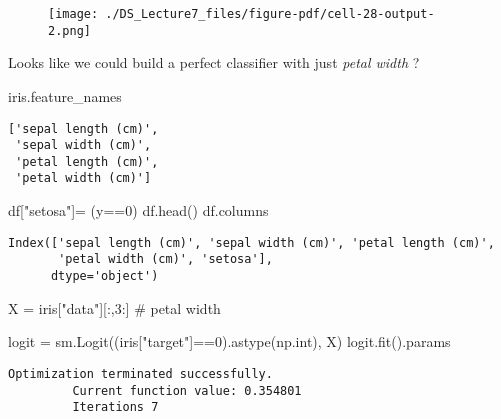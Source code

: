 \documentclass[
  letterpaper,
  DIV=11,
  numbers=noendperiod]{scrreprt}
\newenvironment{Shaded}{\begin{snugshade}}{\end{snugshade}}
\newcommand{\BuiltInTok}[1]{\textcolor[rgb]{0.00,0.23,0.31}{#1}}
\newcommand{\CommentTok}[1]{\textcolor[rgb]{0.37,0.37,0.37}{#1}}
\newcommand{\DecValTok}[1]{\textcolor[rgb]{0.68,0.00,0.00}{#1}}
\newcommand{\NormalTok}[1]{\textcolor[rgb]{0.00,0.23,0.31}{#1}}
\newcommand{\OperatorTok}[1]{\textcolor[rgb]{0.37,0.37,0.37}{#1}}
\newcommand{\StringTok}[1]{\textcolor[rgb]{0.13,0.47,0.30}{#1}}
\begin{document}
\begin{figure}[H]

{\centering \texttt{[image: ./DS\_Lecture7\_files/figure-pdf/cell-28-output-2.png]}

}

\end{figure}

Looks like we could build a perfect classifier with just \emph{petal
width} ?

\begin{Shaded}
\begin{Highlighting}[]
\NormalTok{iris.feature\_names}
\end{Highlighting}
\end{Shaded}

\begin{verbatim}
['sepal length (cm)',
 'sepal width (cm)',
 'petal length (cm)',
 'petal width (cm)']
\end{verbatim}

\begin{Shaded}
\begin{Highlighting}[]
\NormalTok{df[}\StringTok{"setosa"}\NormalTok{]}\OperatorTok{=}\NormalTok{ (y}\OperatorTok{==}\DecValTok{0}\NormalTok{)}
\NormalTok{df.head()}
\NormalTok{df.columns}
\end{Highlighting}
\end{Shaded}

\begin{verbatim}
Index(['sepal length (cm)', 'sepal width (cm)', 'petal length (cm)',
       'petal width (cm)', 'setosa'],
      dtype='object')
\end{verbatim}

\begin{Shaded}
\begin{Highlighting}[]
\NormalTok{X }\OperatorTok{=}\NormalTok{ iris[}\StringTok{"data"}\NormalTok{][:,}\DecValTok{3}\NormalTok{:]  }\CommentTok{\# petal width}

\NormalTok{logit }\OperatorTok{=}\NormalTok{ sm.Logit((iris[}\StringTok{"target"}\NormalTok{]}\OperatorTok{==}\DecValTok{0}\NormalTok{).astype(np.}\BuiltInTok{int}\NormalTok{), X)}
\NormalTok{logit.fit().params}
\end{Highlighting}
\end{Shaded}

\begin{verbatim}
Optimization terminated successfully.
         Current function value: 0.354801
         Iterations 7
\end{verbatim}
\end{document}
